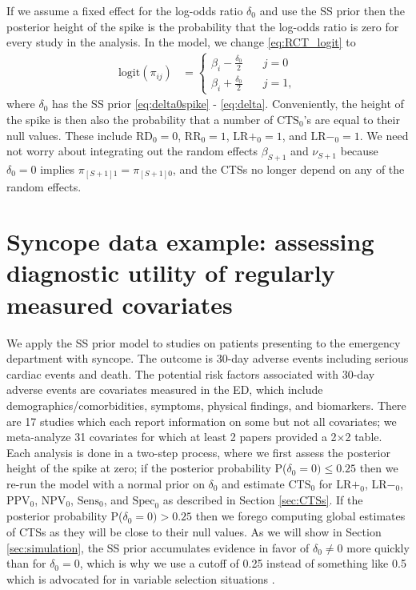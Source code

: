 \documentclass[AMA,STIX1COL]{WileyNJD-v2}
\begin{document}
If we assume a fixed effect for the log-odds ratio $\delta_0$ and use the SS prior then the posterior height of the spike is the probability that the log-odds ratio is zero for every study in the analysis. In the model, we change \eqref{eq:RCT_logit} to 
\begin{align}
\mbox{logit}(\pi_{ij}) & =  \left\{
                  \begin{array}{ll}
                    \beta_{i} - \frac{\delta_0}{2} & \quad j=0 \\ 
                    \beta_{i} + \frac{\delta_0}{2} & \quad j=1,
                  \end{array}
                \right. \label{eq:fixed_logit}
\end{align}
where $\delta_0$ has the SS prior \eqref{eq:delta0spike} - \eqref{eq:delta}. Conveniently, the height of the spike is then also the probability that a number of $\mbox{CTS}_0$'s are equal to their null values. These include $\mbox{RD}_0 = 0$, $\mbox{RR}_0 = 1$, $\mbox{LR}+_0 = 1$, and $\mbox{LR}-_0 = 1$. We need not worry about integrating out the random effects $\beta_{S+1}$ and $\nu_{S+1}$ because $\delta_0 = 0$ implies $\pi_{[S+1]1} = \pi_{[S+1]0}$, and the CTSs no longer depend on any of the random effects. 

\section{Syncope data example: assessing diagnostic utility of regularly measured covariates} \label{sec:syncope}

We apply the SS prior model to studies on patients presenting to the emergency department with syncope. The outcome is 30-day adverse events including serious cardiac events and death. The potential risk factors associated with 30-day adverse events are covariates measured in the ED, which include demographics/comorbidities, symptoms, physical findings, and biomarkers. There are 17 studies which each report information on some but not all covariates; we meta-analyze 31 covariates for which at least 2 papers provided a 2$\times$2 table. Each analysis is done in a two-step process, where we first assess the posterior height of the spike at zero; if the posterior probability P($\delta_0 = 0) \le 0.25$ then we re-run the model with a normal prior on $\delta_0$ and estimate $\mbox{CTS}_0$ for LR$+_0$, LR$-_0$, $\mbox{PPV}_0$, $\mbox{NPV}_0$, $\mbox{Sens}_0$, and $\mbox{Spec}_0$ as described in Section \ref{sec:CTSs}. If the posterior probability P($\delta_0 = 0) > 0.25$ then we forego computing global estimates of CTSs as they will be close to their null values. As we will show in Section \ref{sec:simulation}, the SS prior accumulates evidence in favor of $\delta_0 \ne 0$ more quickly than for $\delta_0 = 0$, which is why we use a cutoff of 0.25 instead of something like 0.5 which is advocated for in variable selection situations \citep{barbieri2004}. 
\end{document}
